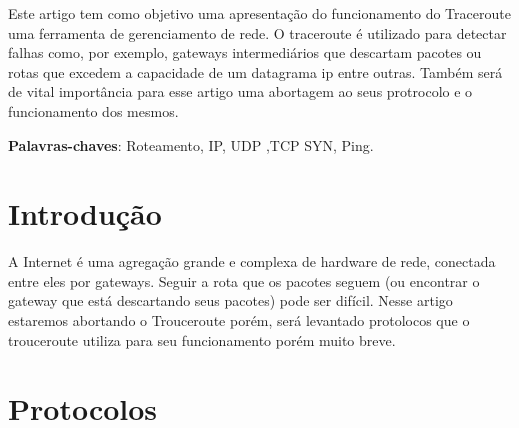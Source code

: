 \documentclass[
	article,			%
	11pt,				%
	oneside,			%
	a4paper,			%
	english,			%
	brazil,				%
	sumario=tradicional
	]{abntex2}
\begin{document}
\frenchspacing 


%
%
\maketitle

\begin{resumoumacoluna}
 Este artigo tem como objetivo uma apresentação do funcionamento do Traceroute uma ferramenta de gerenciamento de rede. O traceroute é utilizado para detectar falhas como, por exemplo, gateways intermediários que descartam pacotes ou rotas que excedem a capacidade de um datagrama ip entre outras. Também será de vital importância para esse artigo uma abortagem ao seus protrocolo e o funcionamento dos mesmos.
 
 
 \vspace{\onelineskip}
 
 \noindent
 \textbf{Palavras-chaves}: Roteamento, IP, UDP ,TCP SYN, Ping.
\end{resumoumacoluna}


\textual

\section*{Introdução}
A Internet é uma agregação grande e complexa de hardware de rede, conectada entre eles por gateways. Seguir a rota que os pacotes seguem (ou encontrar o gateway que está descartando seus pacotes) pode ser difícil. 
Nesse artigo estaremos abortando o Trouceroute porém, será levantado protolocos que o trouceroute utiliza para seu funcionamento porém muito breve.

\section{Protocolos}
\end{document}
